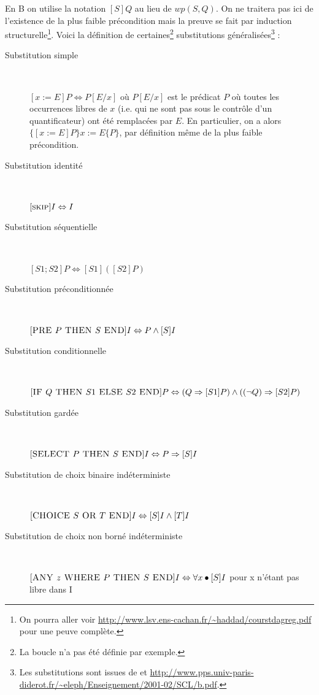 \documentclass[10pt,a4paper]{article}
\begin{document}
En B on utilise la notation $[S]Q$ au lieu de $wp(S, Q)$. On ne traitera pas ici de l'existence de la plus faible précondition mais la preuve se fait par induction structurelle\footnote{On pourra aller voir \url{http://www.lsv.ens-cachan.fr/~haddad/courstdagreg.pdf} pour une peuve complète.}. Voici la définition de certaines\footnote{La boucle n'a pas été définie par exemple.} substitutions généralisées\footnote{Les substitutions sont issues de \cite{habrias2006specifications} et \url{http://www.pps.univ-paris-diderot.fr/~eleph/Enseignement/2001-02/SCL/b.pdf}.} :
\begin{description}
\item[Substitution simple] ~

$[ x := E ]P \Leftrightarrow P[E/x]$ où $P[E/x]$ est le prédicat $P$ où toutes les occurrences libres de $x$ (i.e. qui ne sont pas sous le contrôle d'un quantificateur) ont été remplacées par $E$. En particulier, on a alors $\{ [x := E ]P \} x := E\{ P\}$, par définition même de la plus faible précondition.
\item[Substitution identité]  ~

$[\textsc{skip}]I \Leftrightarrow I$
\item[Substitution séquentielle]  ~

$[S1;S2]P 	\Leftrightarrow [S1]([S2]P)$
\item[Substitution préconditionnée]  ~

$[\textsc{PRE } P \textsc{ THEN } S \textsc{ END}]I \Leftrightarrow P \wedge [S]I$
\item[Substitution conditionnelle]  ~

$[\textsc{IF } Q \textsc{ THEN } S1 \textsc{ ELSE } S2 \textsc{ END}]P \Leftrightarrow (Q \Rightarrow [S1]P) \wedge( (\lnot Q)\Rightarrow [S2]P)$
\item[Substitution gardée]  ~

$[\textsc{SELECT } P \textsc{ THEN } S \textsc{ END}]I \Leftrightarrow P \Rightarrow [S]I$
\item[Substitution de choix binaire indéterministe]  ~

$[\textsc{CHOICE } S \textsc{ OR } T \textsc{ END}]I \Leftrightarrow [S]I \wedge [T ]I$
\item[Substitution de choix non borné indéterministe] ~

$[\textsc{ANY } z \textsc{ WHERE } P \textsc{ THEN } S \textsc{ END}]I \Leftrightarrow \forall x \bullet [S]I$ pour x n'étant pas libre dans I
\end{description}
\end{document}
